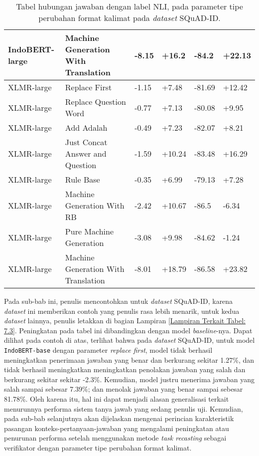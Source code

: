 \begin{table}[H]
\begin{tabular}{llllll}
IndoBERT-large & Machine Generation With Translation &        -8.15 &        +16.2 &       -84.2 &      +22.13 \\
\hline
    XLMR-large &                       Replace First &        -1.15 &        +7.48 &      -81.69 &      +12.42 \\
    XLMR-large &               Replace Question Word &        -0.77 &        +7.13 &      -80.08 &       +9.95 \\
    XLMR-large &                          Add Adalah &        -0.49 &        +7.23 &      -82.07 &       +8.21 \\
    XLMR-large &     Just Concat Answer and Question &        -1.59 &       +10.24 &      -83.48 &      +16.29 \\
    XLMR-large &                           Rule Base &        -0.35 &        +6.99 &      -79.13 &       +7.28 \\
    XLMR-large &          Machine Generation With RB &        -2.42 &       +10.67 &       -86.5 &       -6.34 \\
    XLMR-large &             Pure Machine Generation &        -3.08 &        +9.98 &      -84.62 &       -1.24 \\
    XLMR-large & Machine Generation With Translation &        -8.01 &       +18.79 &      -86.58 &      +23.82 \\
\bottomrule
\end{tabular}
\caption{Tabel hubungan jawaban dengan label NLI, pada parameter tipe perubahan format kalimat pada \emph{dataset} SQuAD-ID.}
\end{table}

Pada sub-bab ini, penulis mencontohkan untuk \emph{dataset} SQuAD-ID, karena \emph{dataset} ini memberikan contoh yang penulis rasa lebih menarik, untuk kedua \emph{dataset} lainnya, penulis letakkan di bagian Lampiran \ref{Lampiran Terkait Tabel: 7.3}. Peningkatan pada tabel ini dibandingkan dengan model \emph{baseline}-nya. Dapat dilihat pada contoh di atas, terlihat bahwa pada \emph{dataset} SQuAD-ID, untuk model \texttt{IndoBERT-base} dengan parameter \emph{replace first}, model tidak berhasil meningkatkan penerimaan jawaban yang benar dan berkurang sekitar 1.27\%, dan tidak berhasil meningkatkan meningkatkan penolakan jawaban yang salah dan berkurang sekitar sekitar -2.3\%. Kemudian, model justru menerima jawaban yang salah sampai sebesar 7.39\%; dan menolak jawaban yang benar sampai sebesar 81.78\%. Oleh karena itu, hal ini dapat menjadi alasan generalisasi terkait menurunnya performa sistem tanya jawab yang sedang penulis uji. Kemudian, pada sub-bab selanjutnya akan dijelaskan mengenai perincian karakteristik pasangan konteks-pertanyaan-jawaban yang mengalami peningkatan atau penurunan performa setelah menggunakan metode \emph{task recasting} sebagai verifikator dengan parameter tipe perubahan format kalimat.

